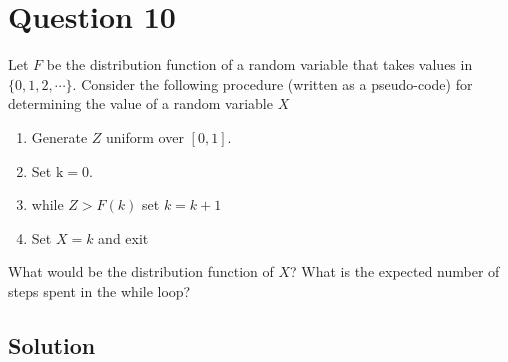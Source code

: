 \section*{Question 10}

Let \( F \) be the distribution function of a random variable that takes values in \( \{ 0,1,2, \cdots \} \).
Consider the following procedure (written as a pseudo-code) for determining the value of a random variable \( X \)
\begin{enumerate}
    \item Generate \( Z \) uniform over \( [0,1] \).
    \item  Set \( \mathrm{k}=0 \).
    \item  while \( Z>F(k) \) set \( k=k+1 \)
    \item Set \( X=k \) and exit
\end{enumerate}
What would be the distribution function of \( X \)?
What is the expected number of steps spent in the while loop?

\subsection*{Solution}

